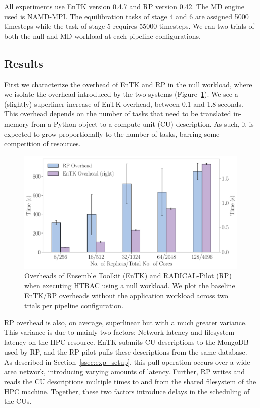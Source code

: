 \documentclass[conference]{IEEEtran}
\begin{document}
All experiments use EnTK version 0.4.7 and RP version 0.42. The MD engine used
is NAMD-MPI\@. The equilibration tasks of stage 4 and 6 are assigned 5000
timesteps while the task of stage 5 requires 55000 timesteps. We ran two
trials of both the null and MD workload at each pipeline configurations.

%
\subsection{Results}\label{ssec:exp_results}

First we characterize the overhead of EnTK and RP in the null workload, where
we isolate the overhead introduced by the two systems
(Figure~\ref{fig:exp1}). We see a (slightly) superliner increase of EnTK
overhead, between 0.1 and 1.8 seconds. This overhead depends on the number of
tasks that need to be translated in-memory from a Python object to a compute
unit (CU) description. As such, it is expected to grow proportionally to the
number of tasks, barring some competition of resources.

\begin{figure}
  \centering
  \includegraphics[width=\columnwidth]{null_workload_overheads.pdf}
  \caption{Overheads of Ensemble Toolkit (EnTK) and RADICAL-Pilot (RP) when
           executing HTBAC using a null workload. We plot the baseline
           EnTK/RP overheads without the application workload across two
           trials per pipeline configuration.}\label{fig:exp1}
\end{figure}

RP overhead is also, on average, superlinear but with a much greater
variance. This variance is due to mainly two factors: Network latency and
filesystem latency on the HPC resource. EnTK submits CU descriptions to the
MongoDB used by RP, and the RP pilot pulls these descriptions from the same
database. As described in Section~\ref{ssec:exp_setup}, this pull operation
occurs over a wide area network, introducing varying amounts of latency.
Further, RP writes and reads the CU descriptions multiple times to and
from the shared filesystem of the HPC machine. Together, these two factors
introduce delays in the scheduling of the CUs.
\end{document}
